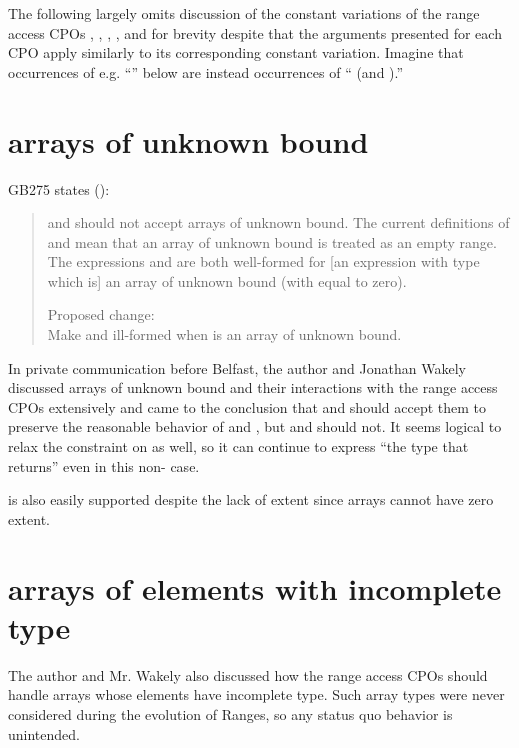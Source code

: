 The following largely omits discussion of the constant variations of the range access CPOs
, , , , and 
for brevity despite that the arguments presented for each CPO apply similarly
to its corresponding constant variation.
Imagine that occurrences of e.g. ``'' below
are instead occurrences of `` (and ).''

\section{arrays of unknown bound}
GB275 states (\cite{GB275}):
\begin{quote}
 and  should not accept arrays of unknown bound.
The current definitions of  and 
mean that an array of unknown bound is treated as an empty range.
The expressions  and  are both well-formed
for [an expression  with type  which is] an array of unknown bound
(with  equal to zero).

Proposed change: \\
Make  and  ill-formed
when  is an array of unknown bound.
\end{quote}

In private communication before Belfast,
the author and Jonathan Wakely discussed arrays of unknown bound
and their interactions with the range access CPOs extensively
and came to the conclusion that
 and  should accept them
to preserve the reasonable behavior of  and ,
but  and  should not.
It seems logical to relax the  constraint on  as well,
so it can continue to express ``the type that  returns''
even in this non- case.

 is also easily supported
despite the lack of extent
since arrays cannot have zero extent.


\section{arrays of elements with incomplete type}

The author and Mr. Wakely also discussed
how the range access CPOs should handle
arrays whose elements have incomplete type.
Such array types were never considered during the evolution of Ranges,
so any status quo behavior is unintended.

